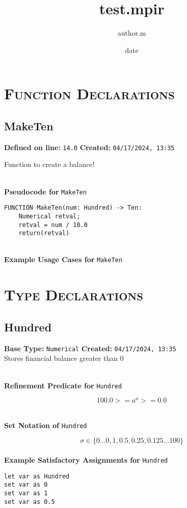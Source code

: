 \documentclass{article}
\title{test.mpir}
\author{author.m}
\date{date}
\begin{document}
\maketitle
\clearpage
\tableofcontents
\clearpage

\section{\textsc{Function Declarations}}

\subsection{MakeTen}

\textbf{Defined on line:} \verb|14.0| \hfill \textbf{Created:} \verb|04/17/2024, 13:35| 


Function to create a balance!

\textbf{\\ Pseudocode for } \texttt{MakeTen}
\begin{verbatim}
FUNCTION MakeTen(num: Hundred) -> Ten:
	Numerical retval;
	retval = num / 10.0
	return(retval)
\end{verbatim}

\textbf{\\ Example Usage Cases for } \texttt{MakeTen}
\clearpage

\section{\textsc{Type Declarations}}

\subsection{Hundred}
\textbf{Base Type:} \verb|Numerical| \hfill \textbf{Created:} \verb|04/17/2024, 13:35| \\
Stores financial balance greater than 0

\textbf{\\ Refinement Predicate for } \texttt{Hundred}

$$ 100.0 >= a ^ a >= 0.0 $$

\textbf{\\ Set Notation of } \texttt{Hundred}

$$\sigma \in \{ 0 ... 0, 1, 0.5, 0.25, 0.125 ... 100 \}$$ \ \
\textbf{\\ Example Satisfactory Assignments for } \texttt{Hundred}
\begin{verbatim}
let var as Hundred
set var as 0
set var as 1
set var as 0.5
\end{verbatim}
\end{document}
